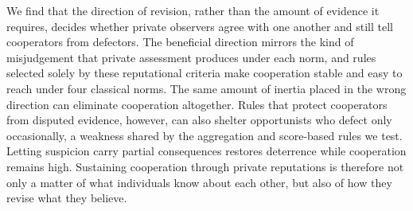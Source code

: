 We find that the direction of revision, rather than the amount of evidence it requires, decides whether private observers agree with one another and still tell cooperators from defectors. The beneficial direction mirrors the kind of misjudgement that private assessment produces under each norm, and rules selected solely by these reputational criteria make cooperation stable and easy to reach under four classical norms. The same amount of inertia placed in the wrong direction can eliminate cooperation altogether. Rules that protect cooperators from disputed evidence, however, can also shelter opportunists who defect only occasionally, a weakness shared by the aggregation and score-based rules we test. Letting suspicion carry partial consequences restores deterrence while cooperation remains high. Sustaining cooperation through private reputations is therefore not only a matter of what individuals know about each other, but also of how they revise what they believe.
